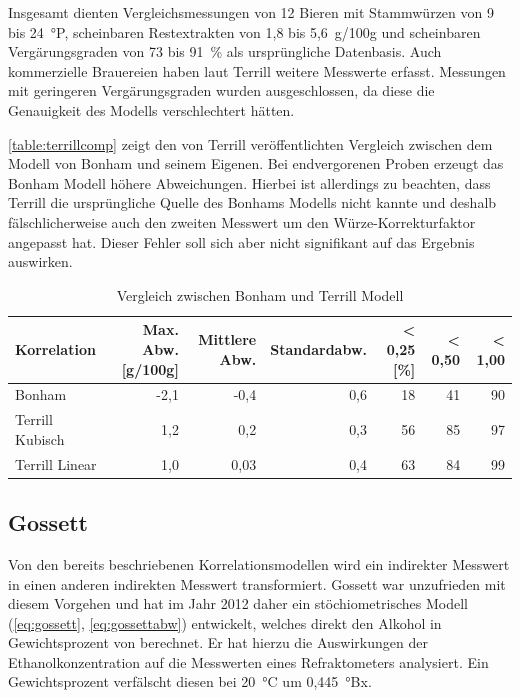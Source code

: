 \documentclass[a4paper,parskip=half]{scrartcl}
\begin{document}
Insgesamt dienten Vergleichsmessungen von 12 Bieren mit Stammwürzen
von 9 bis 24~°P, scheinbaren Restextrakten von 1,8 bis
5,6~g/100g und scheinbaren Vergärungsgraden von 73 bis 91~\%
als ursprüngliche Datenbasis. Auch kommerzielle Brauereien haben
laut Terrill weitere Messwerte erfasst. Messungen mit geringeren
Vergärungsgraden wurden ausgeschlossen, da diese die Genauigkeit des
Modells verschlechtert hätten.
\autocite{Terrill2010a,Terrill2011,Terrill2010,Terrill2013}

\autoref{table:terrillcomp} zeigt den von Terrill veröffentlichten
Vergleich zwischen dem Modell von Bonham und seinem Eigenen. Bei
endvergorenen Proben erzeugt das Bonham Modell höhere
Abweichungen. Hierbei ist allerdings zu beachten, dass
Terrill die ursprüngliche Quelle des Bonhams Modells nicht kannte
und deshalb fälschlicherweise auch den zweiten Messwert um
den Würze-Korrekturfaktor angepasst hat. Dieser Fehler soll sich
aber nicht signifikant auf das Ergebnis auswirken.
\autocite{Terrill2010a,Terrill2011,Terrill2010}

\begin{table}[h]
\centering
\begin{tabular}{lrrrrrr}
\toprule
Korrelation &  Max. Abw. [g/100g] & Mittlere Abw. & Standardabw. & < 0,25 [\%] & < 0,50 & < 1,00 \\
\midrule
Bonham & -2,1 & -0,4 & 0,6 & 18 & 41 & 90 \\
Terrill Kubisch & 1,2 & 0,2 & 0,3 & 56 & 85 & 97 \\
Terrill Linear & 1,0 & 0,03 & 0,4 & 63 & 84 & 99 \\
\bottomrule
\end{tabular}
\caption{Vergleich zwischen Bonham und Terrill Modell}
\label{table:terrillcomp}
\end{table}

\subsection*{Gossett}

Von den bereits beschriebenen Korrelationsmodellen wird ein indirekter
Messwert in einen anderen indirekten Messwert transformiert. Gossett
war unzufrieden mit diesem Vorgehen und hat im Jahr 2012 daher ein
stöchiometrisches Modell (\autoref{eq:gossett}, \autoref{eq:gossettabw})
entwickelt, welches direkt den Alkohol in Gewichtsprozent von
berechnet. Er hat hierzu die Auswirkungen der Ethanolkonzentration
auf die Messwerten eines Refraktometers analysiert. Ein Gewichtsprozent
verfälscht diesen bei 20~°C um 0,445~°Bx. 
\autocite{Gossett2012,Gossett2012a,Gossett2012b}
\end{document}
